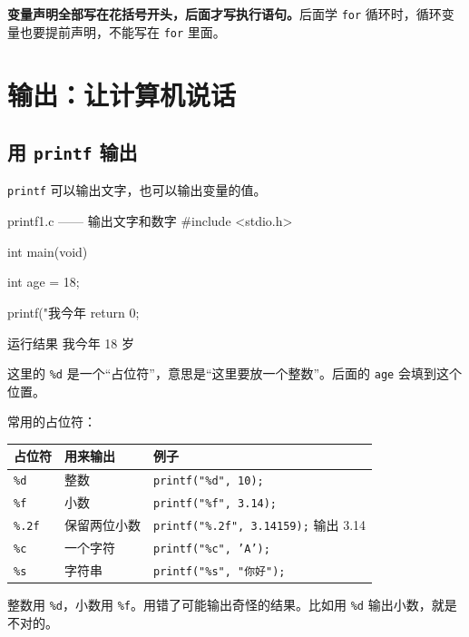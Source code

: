 \begin{c89box}[记住这句话]
\textbf{变量声明全部写在花括号开头，后面才写执行语句。}后面学 \texttt{for} 循环时，循环变量也要提前声明，不能写在 \texttt{for} 里面。
\end{c89box}

\section{输出：让计算机说话}

\subsection{用 \texttt{printf} 输出}

\texttt{printf} 可以输出文字，也可以输出变量的值。

\begin{codebox}{printf1.c —— 输出文字和数字}
#include <stdio.h>

int main(void)
{
    int age = 18;

    printf("我今年 %
    return 0;
}
\end{codebox}

\begin{outbox}{运行结果}
我今年 18 岁
\end{outbox}

这里的 \texttt{\%d} 是一个“占位符”，意思是“这里要放一个整数”。后面的 \texttt{age} 会填到这个位置。

常用的占位符：

\begin{center}
\begin{tabular}{@{}lll@{}}
\toprule
占位符 & 用来输出 & 例子 \\
\midrule
\texttt{\%d} & 整数 & \texttt{printf("\%d", 10);} \\
\texttt{\%f} & 小数 & \texttt{printf("\%f", 3.14);} \\
\texttt{\%.2f} & 保留两位小数 & \texttt{printf("\%.2f", 3.14159);} 输出 3.14 \\
\texttt{\%c} & 一个字符 & \texttt{printf("\%c", 'A');} \\
\texttt{\%s} & 字符串 & \texttt{printf("\%s", "你好");} \\
\bottomrule
\end{tabular}
\end{center}

\begin{pitfall}[占位符和类型要对应]
整数用 \texttt{\%d}，小数用 \texttt{\%f}。用错了可能输出奇怪的结果。比如用 \texttt{\%d} 输出小数，就是不对的。
\end{pitfall}

